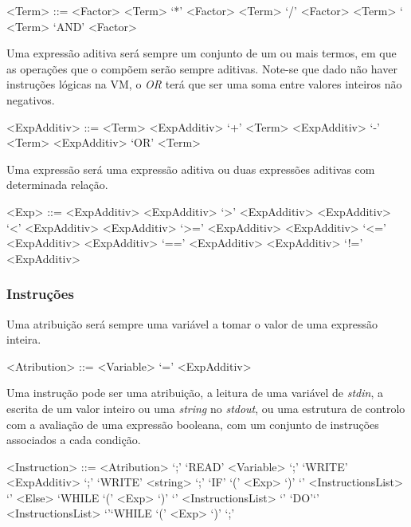 \begin{grammar}
<Term> ::= <Factor>
\alt <Term> `*'  <Factor>
\alt <Term> `/' <Factor>
\alt <Term> `%
\alt <Term> `AND' <Factor>
\end{grammar}


Uma expressão aditiva será sempre um conjunto de um ou mais termos, em que as operações que o compõem
serão sempre aditivas. Note-se que dado não haver instruções lógicas na
VM, o \emph{OR} terá que ser uma soma entre valores inteiros não negativos.

\begin{grammar}
<ExpAdditiv> ::= <Term> 
\alt <ExpAdditiv> `+' <Term>
\alt <ExpAdditiv> `-' <Term> 
\alt <ExpAdditiv> `OR' <Term> 
\end{grammar}

Uma expressão será uma expressão aditiva ou duas expressões aditivas com
determinada relação.

\begin{grammar}
<Exp> ::= <ExpAdditiv>             
\alt  <ExpAdditiv> `>'  <ExpAdditiv> 
\alt  <ExpAdditiv> `<'  <ExpAdditiv> 
\alt  <ExpAdditiv> `>=' <ExpAdditiv> 
\alt  <ExpAdditiv> `<=' <ExpAdditiv> 
\alt  <ExpAdditiv> `==' <ExpAdditiv> 
\alt  <ExpAdditiv> `!=' <ExpAdditiv> 
\end{grammar}


\subsubsection{Instruções}
\label{subsec:subsubsec:instrucoes:desenho}

Uma atribuição será sempre uma variável a tomar o valor de uma expressão
inteira.
\begin{grammar}
<Atribution> ::=  <Variable> `=' <ExpAdditiv> 
\end{grammar}


Uma instrução pode ser uma atribuição, a leitura de uma variável de
\emph{stdin}, a escrita de um valor inteiro ou uma \emph{string} no
\emph{stdout}, ou uma estrutura de controlo com a avaliação de uma expressão
booleana, com um conjunto de instruções associados a cada condição.

\begin{grammar}
<Instruction> ::= <Atribution> `;' 
\alt `READ'  <Variable> `;'
\alt `WRITE' <ExpAdditiv> `;'                      
\alt `WRITE' <string> `;'
\alt `IF' `(' <Exp> `)' `{' <InstructionsList> `}' <Else>
\alt `WHILE `(' <Exp> `)' `{' <InstructionsList> `}' 
\alt `DO'`{' <InstructionsList> `}'`WHILE `(' <Exp> `)' `;' 
\end{grammar}


